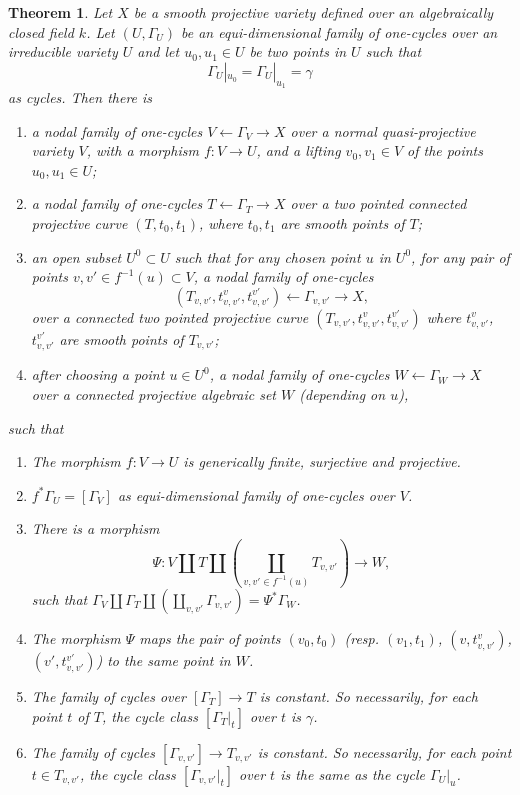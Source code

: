 \documentclass{amsart}
\newtheorem{thm}[theorem]{Theorem}
\theoremstyle{definition}
\theoremstyle{remark}
\begin{document}
\begin{thm}\label{thm:filtered_sm}
Let $X$ be a smooth projective variety defined over an algebraically closed field $k$.
Let $(U, \Gamma_U)$ be an equi-dimensional family of one-cycles over an irreducible variety $U$ and let $u_0, u_1 \in U$ be two points in $U$ such that 
\[
\Gamma_U|_{u_0}= \Gamma_U|_{u_1}=\gamma
\]
as cycles.
Then there is
\begin{enumerate}
    \item a nodal family of one-cycles $V\leftarrow \Gamma_V \to X$ over a normal quasi-projective variety  $V$,  with a morphism $f: V \to U$, and a lifting $v_0, v_1 \in V$ of the points $u_0, u_1 \in U$;
    \item a nodal family of one-cycles $T \leftarrow \Gamma_T \to X$ over a two pointed connected projective curve $(T, t_0, t_1)$, where $t_0, t_1$ are smooth points of $T$;
    \item\label{cond:3} an open subset $U^0\subset U$ such that for any chosen point $u$ in $U^0$, for any pair of points $v, v' \in f^{-1}(u)\subset V$, a nodal family of one-cycles $$(T_{v, v'}, t_{v, v'}^v, t_{v, v'}^{v'})\leftarrow \Gamma_{v, v'} \to X, $$ over a connected two pointed projective curve $(T_{v, v'}, t_{v, v'}^v, t_{v, v'}^{v'})$ where $t_{v, v'}^v$, $t_{v, v'}^{v'}$ are smooth points of $T_{v, v'}$;
    \item  after choosing a point $u \in U^0$, a nodal family of one-cycles $W\leftarrow \Gamma_W \to X$ over a connected projective algebraic set  $W$ (depending on $u$),
\end{enumerate} 
such that 
\begin{enumerate}
    \item[(i)] The morphism $f: V \to U$ is generically finite, surjective and projective.
    
    \item[(ii)]  $f^*\Gamma_U=[\Gamma_V]$ as equi-dimensional family of one-cycles over $V$.
    
    \item[(iii)] There is a morphism
    \[
    \Psi: V\coprod T\coprod (\coprod_{v, v' \in f^{-1}(u)}T_{v, v'})\to W,
    \]
    such that $\Gamma_V \coprod \Gamma_T \coprod (\coprod_{v, v'}\Gamma_{v, v'})=\Psi^*\Gamma_W$.
    
    \item[(iv)] The morphism $\Psi$ maps the pair of points $(v_0, t_0)$ (resp. $(v_1, t_1)$, $(v, t_{v, v'}^v)$, $(v', t_{v, v'}^{v'})$) to the same point in $W$. 
    
    \item[(v)]  The family of cycles over $[\Gamma_T]\to T$ is constant. So necessarily, for each point $t$ of $T$, the cycle class $[\Gamma_T|_{t}]$ over $t$ is $\gamma$.


\item[(vi)] The family of cycles $[\Gamma_{v, v'}] \to T_{v, v'}$ is constant. So necessarily, for each point $t \in T_{v, v'}$, the cycle class $[\Gamma_{v, v'}|_t]$ over $t$ is the same as the cycle $\Gamma_U|_u$.
\end{enumerate}
\end{thm}
\end{document}
